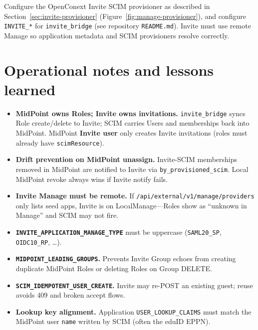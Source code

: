 \documentclass[11pt,a4paper]{article}
\begin{document}
Configure the OpenConext Invite SCIM provisioner as described in
Section~\ref{sec:invite-provisioner} (Figure~\ref{fig:manage-provisioner}),
and configure \texttt{INVITE\_*} for \texttt{invite\_bridge} (see repository
\texttt{README.md}). Invite must use remote Manage so application metadata and
SCIM provisioners resolve correctly.

\section{Operational notes and lessons learned}

\begin{itemize}[leftmargin=*]
  \item \textbf{MidPoint owns Roles; Invite owns invitations.}
        \texttt{invite\_bridge} syncs Role create/delete to Invite; SCIM carries
        Users and memberships back into MidPoint. MidPoint \textbf{Invite user}
        only creates Invite invitations (roles must already have
        \texttt{scimResource}).
  \item \textbf{Drift prevention on MidPoint unassign.}
        Invite-SCIM memberships removed in MidPoint are notified to Invite via
        \texttt{by\_provisioned\_scim}. Local MidPoint revoke always wins if
        Invite notify fails.
  \item \textbf{Invite Manage must be remote.} If
        \texttt{/api/external/v1/manage/providers} only lists seed apps, Invite
        is on LocalManage---Roles show as ``unknown in Manage'' and SCIM may not
        fire.
  \item \textbf{\texttt{INVITE\_APPLICATION\_MANAGE\_TYPE}} must be uppercase
        (\texttt{SAML20\_SP}, \texttt{OIDC10\_RP}, \ldots).
  \item \textbf{\texttt{MIDPOINT\_LEADING\_GROUPS}.} Prevents Invite Group echoes
        from creating duplicate MidPoint Roles or deleting Roles on Group DELETE.
  \item \textbf{\texttt{SCIM\_IDEMPOTENT\_USER\_CREATE}.} Invite may re-POST an
        existing guest; reuse avoids 409 and broken accept flows.
  \item \textbf{Lookup key alignment.} Application
        \texttt{USER\_LOOKUP\_CLAIMS} must match the MidPoint user
        \texttt{name} written by SCIM (often the eduID EPPN).
\end{itemize}
\end{document}
